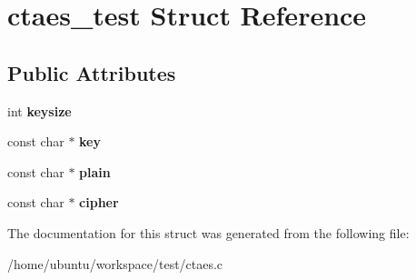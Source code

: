 \hypertarget{structctaes__test}{\section{ctaes\-\_\-test Struct Reference}
\label{structctaes__test}
}
\subsection*{Public Attributes}
\begin{DoxyCompactItemize}
\item 
\hypertarget{structctaes__test_aa492d1e9e2e9ea7081f2375d9f271452}{int {\bfseries keysize}}\label{structctaes__test_aa492d1e9e2e9ea7081f2375d9f271452}

\item 
\hypertarget{structctaes__test_ab6b1e7d3a507e760e6b759674600781f}{const char $\ast$ {\bfseries key}}\label{structctaes__test_ab6b1e7d3a507e760e6b759674600781f}

\item 
\hypertarget{structctaes__test_a47efc9d1469d7381441d5de646dbbb72}{const char $\ast$ {\bfseries plain}}\label{structctaes__test_a47efc9d1469d7381441d5de646dbbb72}

\item 
\hypertarget{structctaes__test_a39ebe782ab0a6d535001c08324f1b443}{const char $\ast$ {\bfseries cipher}}\label{structctaes__test_a39ebe782ab0a6d535001c08324f1b443}

\end{DoxyCompactItemize}


The documentation for this struct was generated from the following file\-:\begin{DoxyCompactItemize}
\item 
/home/ubuntu/workspace/test/ctaes.\-c\end{DoxyCompactItemize}
